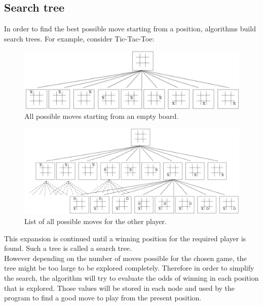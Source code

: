 \subsection{Search tree}
\label{trees}
In order to find the best possible move starting from a position, algorithms build search trees. 
For example, consider Tic-Tac-Toe: \cite{images_annexes}
\begin{figure}[H]
	\centering
	\includegraphics[width=15cm]{5_Annexes/img/Tree1.png}
	\caption{\label{fig:tree1}All possible moves starting from an empty board.}
\end{figure}
\noindent
\begin{figure}[H]
	\centering
	\includegraphics[width=15cm]{5_Annexes/img/Tree2.png}
	\caption{\label{fig:tree2}List of all possible moves for the other player.}
\end{figure}

This expansion is continued until a winning position for the required player is found. Such a tree is called a search tree.
\bigskip\\
However depending on the number of moves possible for the chosen game, the tree might be too large to be explored completely. Therefore in order to simplify the search, the algorithm will try to evaluate the odds of winning in each position that is explored. Those values will be stored in each node and used by the program to find a good move to play from the present position.